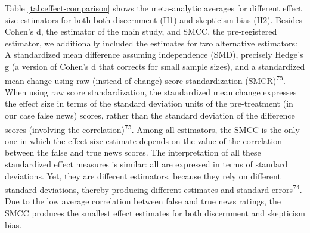 \documentclass[
  man]{apa6}
\begin{document}
Table \ref{tab:effect-comparison} shows the meta-analytic averages for different effect size estimators for both both discernment (H1) and skepticism bias (H2). Besides Cohen's d, the estimator of the main study, and SMCC, the pre-registered estimator, we additionally included the estimates for two alternative estimators: A standardized mean difference assuming independence (SMD), precisely Hedge's g (a version of Cohen's d that corrects for small sample sizes), and a standardized mean change using raw (instead of change) score standardization (SMCR)\textsuperscript{75}. When using raw score standardization, the standardized mean change expresses the effect size in terms of the standard deviation units of the pre-treatment (in our case false news) scores, rather than the standard deviation of the difference scores (involving the correlation)\textsuperscript{75}. Among all estimators, the SMCC is the only one in which the effect size estimate depends on the value of the correlation between the false and true news scores. The interpretation of all these standardized effect measures is similar: all are expressed in terms of standard deviations. Yet, they are different estimators, because they rely on different standard deviations, thereby producing different estimates and standard errors\textsuperscript{74}. Due to the low average correlation between false and true news ratings, the SMCC produces the smallest effect estimates for both discernment and skepticism bias.
\end{document}
